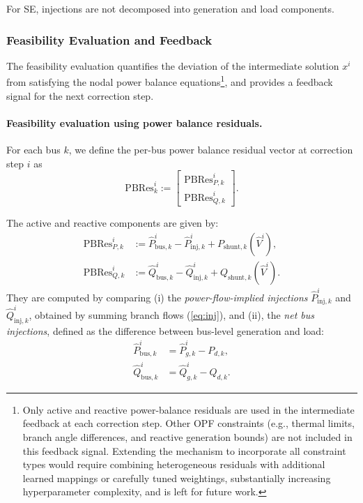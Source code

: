 For SE, injections are not decomposed into generation and load components.

\subsubsection{Feasibility Evaluation and Feedback}
\label{subsec:feedback}


The feasibility evaluation quantifies the deviation of the intermediate solution $x^i$ from satisfying the nodal power balance equations\footnote{Only active and reactive power-balance residuals are used in the intermediate feedback at each correction step. Other OPF constraints (e.g., thermal limits, branch angle differences, and reactive generation bounds) are not included in this feedback signal. Extending the mechanism to incorporate all constraint types would require combining heterogeneous residuals with additional learned mappings or carefully tuned weightings, substantially increasing hyperparameter complexity, and is left for future work.}, and provides a feedback signal for the next correction step.

\paragraph{Feasibility evaluation using power balance residuals.}
For each bus $k$, we define the per-bus power balance residual vector at correction step $i$ as
\begin{equation}
\mathrm{PBRes}_k^i :=
\begin{bmatrix}
\mathrm{PBRes}_{P,k}^i \\
\mathrm{PBRes}_{Q,k}^i
\end{bmatrix}.
\end{equation}

The active and reactive components are given by:
\begin{align}
\mathrm{PBRes}_{P,k}^i
&:=
\hat{P}_{\mathrm{bus},k}^i
-
\hat{P}_{\mathrm{inj},k}^i
+
P_{\mathrm{shunt},k}(\hat{V}^i),
\nonumber\\
\mathrm{PBRes}_{Q,k}^i
&:=
\hat{Q}_{\mathrm{bus},k}^i
-
\hat{Q}_{\mathrm{inj},k}^i
+
Q_{\mathrm{shunt},k}(\hat{V}^i).
\label{eq:PBRes}
\end{align}
They are computed by comparing (i) the \emph{power-flow-implied injections} $\hat{P}_{\mathrm{inj},k}^i$ and $\hat{Q}_{\mathrm{inj},k}^i$, obtained by summing branch flows (\cref{eq:inj}), and (ii), the \emph{net bus injections}, defined as the difference between bus-level generation and load:
\begin{align}
\label{eq:bus-inj}
\hat{P}_{\mathrm{bus},k}^i &= \hat{P}_{g,k}^i - P_{d,k}, \\
\hat{Q}_{\mathrm{bus},k}^i &= \hat{Q}_{g,k}^i - Q_{d,k}.
\end{align}



